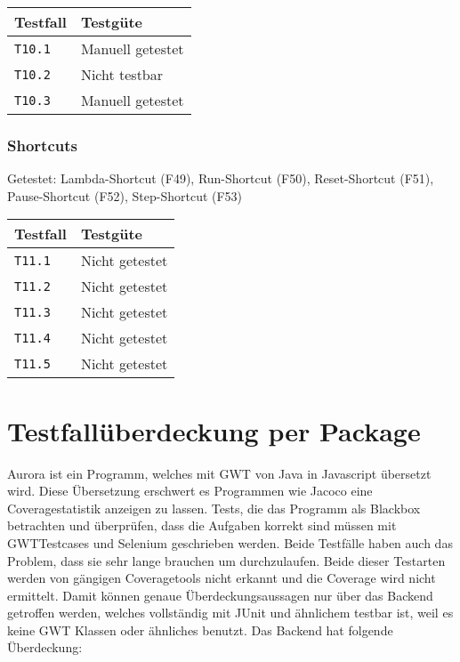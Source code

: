 \documentclass[parskip=full,11pt,twoside]{scrartcl}
\newcommand{\testline}[2]{
    \texttt{#1} & 
    \ifthenelse{\equal{#2}{Nicht getestet}}
        {\cellcolor{red!20}}
        {}
    \ifthenelse{\equal{#2}{Manuell getestet}}
        {\cellcolor{LimeGreen!20}}
        {}
    \ifthenelse{\equal{#2}{Automatisiert getestet}}
        {\cellcolor{green!20}}
        {}
    \ifthenelse{\equal{#2}{Nicht testbar}}
    {\cellcolor{gray!20}}
     {}
    #2 \\ \hline
}
\begin{document}
    \label{shortcuts}
    \begin{center}
        \begin{tabular}{ p{9cm} p{4cm}}
            Testfall & Testgüte \\ \hline
            \testline{T10.1}{Manuell getestet}
            \testline{T10.2}{Nicht testbar}
            \testline{T10.3}{Manuell getestet}
        \end{tabular}
    \end{center}

\subsubsection{Shortcuts}
    Getestet:
    Lambda-Shortcut (F49),
    Run-Shortcut (F50),
    Reset-Shortcut (F51),
    Pause-Shortcut (F52),
    Step-Shortcut (F53)

    \label{shortcuts}
    \begin{center}
        \begin{tabular}{ p{9cm} p{4cm}}
            Testfall & Testgüte \\ \hline
            \testline{T11.1}{Nicht getestet}
            \testline{T11.2}{Nicht getestet}
            \testline{T11.3}{Nicht getestet}
            \testline{T11.4}{Nicht getestet}
            \testline{T11.5}{Nicht getestet}
        \end{tabular}
    \end{center}

\section{Testfallüberdeckung per Package}
    Aurora ist ein Programm, welches mit GWT von Java in Javascript übersetzt wird.
    Diese Übersetzung erschwert es Programmen wie Jacoco eine Coveragestatistik anzeigen zu lassen.
    Tests, die das Programm als Blackbox betrachten und überprüfen, dass die Aufgaben korrekt sind müssen
    mit GWTTestcases und Selenium geschrieben werden.
    Beide Testfälle haben auch das Problem, dass sie sehr lange brauchen um durchzulaufen.
    Beide dieser Testarten werden von gängigen Coveragetools nicht erkannt und die Coverage wird nicht
    ermittelt.
    Damit können genaue Überdeckungsaussagen nur über das Backend getroffen werden, welches vollständig mit JUnit und ähnlichem
    testbar ist, weil es keine GWT Klassen oder ähnliches benutzt.
	Das Backend hat folgende Überdeckung:
	
\end{document}
